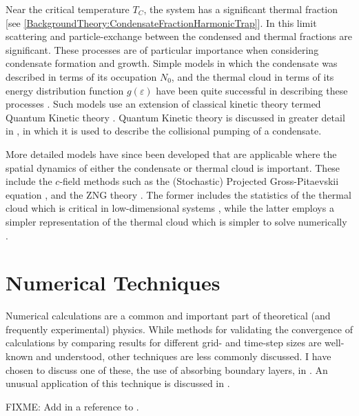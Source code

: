 Near the critical temperature $T_C$, the system has a significant thermal fraction [see \eqref{BackgroundTheory:CondensateFractionHarmonicTrap}].  In this limit scattering and particle-exchange between the condensed and thermal fractions are significant.  These processes are of particular importance when considering condensate formation and growth.  Simple models in which the condensate was described in terms of its occupation $N_0$, and the thermal cloud in terms of its energy distribution function $g(\varepsilon)$ have been quite successful in describing these processes \citep{Davis:2000vn,Bijlsma:2000}.  Such models use an extension of classical kinetic theory termed Quantum Kinetic theory \citep{Gardiner:1997tz,Jaksch:1997ug,Gardiner:1998wx,Jaksch:1998sj,Gardiner:2000ug,Lee:2000vs,Davis:2000vn}.  Quantum Kinetic theory is discussed in greater detail in , in which it is used to describe the collisional pumping of a condensate.

More detailed models have since been developed that are applicable where the spatial dynamics of either the condensate or thermal cloud is important.  These include the $c$-field methods such as the (Stochastic) Projected Gross-Pitaevskii equation \citep{Blakie:2008a}, and the ZNG theory \citep{Zaremba:1999,Proukakis:2008}.  The former includes the statistics of the thermal cloud which is critical in low-dimensional systems \citep{Blakie:2008a}, while the latter employs a simpler representation of the thermal cloud which is simpler to solve numerically \citep{Proukakis:2008}.

\section{Numerical Techniques}
\label{BackgroundTheory:NumericalTechniques}

Numerical calculations are a common and important part of theoretical (and frequently experimental) physics.  While methods for validating the convergence of calculations by comparing results for different grid- and time-step sizes are well-known and understood, other techniques are less commonly discussed.  I have chosen to discuss one of these, the use of absorbing boundary layers, in .  An unusual application of this technique is discussed in .

FIXME: Add in a reference to .

